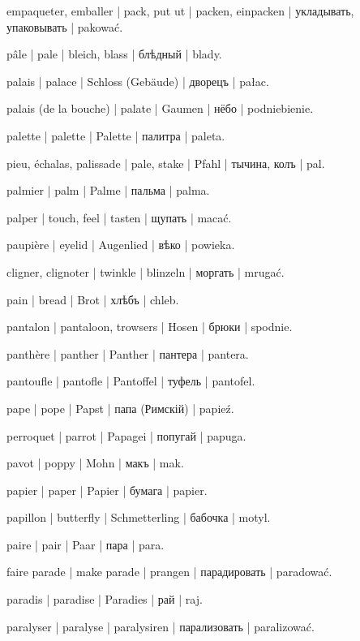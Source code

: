 \begin{outdent}{1em}
empaqueter, emballer | pack, put ut | packen, einpacken | укладывать, упаковывать | pakować.

pâle | pale | bleich, blass | блѣдный | blady.

palais | palace | Schloss (Gebäude) | дворецъ | pałac.

palais (de la bouche) | palate | Gaumen | нёбо | podniebienie.

palette | palette | Palette | палитра | paleta.

pieu, échalas, palissade | pale, stake | Pfahl | тычина, колъ | pal.

palmier | palm | Palme | пальма | palma.

palper | touch, feel | tasten | щупать | macać.

paupière | eyelid | Augenlied | вѣко | powieka.

\uvsubentry{}
cligner, clignoter | twinkle | blinzeln | моргать | mrugać.

pain | bread | Brot | хлѣбъ | chleb.

pantalon | pantaloon, trowsers | Hosen | брюки | spodnie.

panthère | panther | Panther | пантера | pantera.

pantoufle | pantofle | Pantoffel | туфель | pantofel.

pape | pope | Papst | папа (Римскій) | papieź.

perroquet | parrot | Papagei | попугай | papuga.

pavot | poppy | Mohn | макъ | mak.

papier | paper | Papier | бумага | papier.

papillon | butterfly | Schmetterling | бабочка | motyl.

paire | pair | Paar | пара | para.

faire parade | make parade | prangen | парадировать | paradować.

paradis | paradise | Paradies | рай | raj.

paralyser | paralyse | paralysiren | парализовать | paralizować.


\end{outdent}
